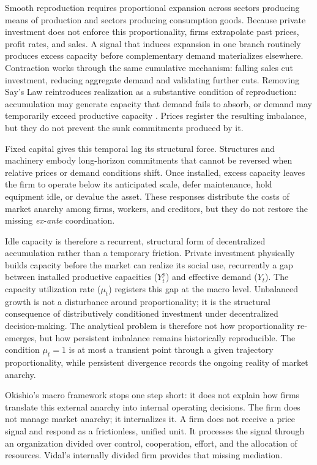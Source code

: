 Smooth reproduction requires proportional expansion across
sectors producing means of production and sectors producing
consumption goods. Because private investment does not enforce
this proportionality, firms extrapolate past prices, profit
rates, and sales. A signal that induces expansion in one branch
routinely produces excess capacity before complementary demand
materializes elsewhere. Contraction works through the same
cumulative mechanism: falling sales cut investment, reducing
aggregate demand and validating further cuts. Removing Say's
Law reintroduces realization as a substantive condition of
reproduction: accumulation may generate capacity that demand
fails to absorb, or demand may temporarily exceed productive
capacity \citep{Foley1985}. Prices register the
resulting imbalance, but they do not prevent the sunk
commitments produced by it.


Fixed capital gives this temporal lag its structural force.
Structures and machinery embody long-horizon commitments that
cannot be reversed when relative prices or demand conditions
shift. Once installed, excess capacity leaves the firm to
operate below its anticipated scale, defer maintenance, hold
equipment idle, or devalue the asset. These responses
distribute the costs of market anarchy among firms, workers,
and creditors, but they do not restore the missing
\textit{ex-ante} coordination.

Idle capacity is therefore a recurrent, structural form of
decentralized accumulation rather than a temporary friction.
Private investment physically builds capacity before the market
can realize its social use, recurrently a gap
between installed productive capacities ($Y^p_t$) and effective demand ($Y_t$). The capacity utilization rate ($\mu_t$) registers this gap at the macro level. Unbalanced growth is not a disturbance around proportionality; it is the structural consequence of distributively conditioned investment under
decentralized decision-making. The analytical problem is
therefore not how proportionality re-emerges, but how persistent
imbalance remains historically reproducible. The condition
$\mu_t = 1$ is at most a transient point through a given trajectory
proportionality, while persistent divergence records the ongoing
reality of market anarchy.

Okishio's macro framework stops one step short: it does not explain how firms translate this external anarchy into internal operating decisions. The firm does not manage market anarchy; it internalizes it. A firm does not receive a price signal and respond as a frictionless, unified unit. It processes the signal through an organization divided over control, cooperation,
effort, and the allocation of resources. Vidal's internally
divided firm provides that missing mediation.

